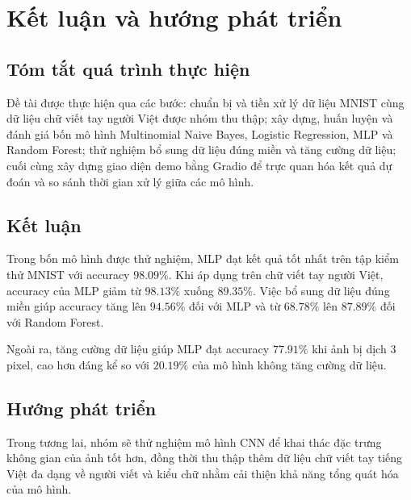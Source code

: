 
\section{Kết luận và hướng phát triển}

\subsection{Tóm tắt quá trình thực hiện}

Đề tài được thực hiện qua các bước: chuẩn bị và tiền xử lý
dữ liệu MNIST cùng dữ liệu chữ viết tay người Việt được nhóm thu thập; xây dựng,
huấn luyện và đánh giá bốn mô hình Multinomial Naive Bayes,
Logistic Regression, MLP và Random Forest; thử nghiệm bổ sung
dữ liệu đúng miền và tăng cường dữ liệu; cuối cùng xây dựng
giao diện demo bằng Gradio để trực quan hóa kết quả dự đoán
và so sánh thời gian xử lý giữa các mô hình.

\subsection{Kết luận}

Trong bốn mô hình được thử nghiệm, MLP đạt kết quả tốt nhất
trên tập kiểm thử MNIST với accuracy $98.09\%$. Khi áp dụng
trên chữ viết tay người Việt, accuracy của MLP giảm từ
$98.13\%$ xuống $89.35\%$. Việc bổ sung dữ liệu đúng miền
giúp accuracy tăng lên $94.56\%$ đối với MLP và từ $68.78\%$
lên $87.89\%$ đối với Random Forest.

Ngoài ra, tăng cường dữ liệu giúp MLP đạt accuracy $77.91\%$
khi ảnh bị dịch $3$ pixel, cao hơn đáng kể so với $20.19\%$
của mô hình không tăng cường dữ liệu.

\subsection{Hướng phát triển}

Trong tương lai, nhóm sẽ thử nghiệm mô hình CNN để khai
thác đặc trưng không gian của ảnh tốt hơn, đồng thời thu thập
thêm dữ liệu chữ viết tay tiếng Việt đa dạng về người viết
và kiểu chữ nhằm cải thiện khả năng tổng quát hóa của mô hình.
